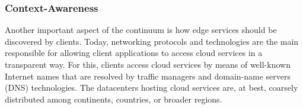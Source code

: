 






\subsubsection{Context-Awareness}



Another important aspect of the continuum is how edge services should be discovered by clients. Today, networking protocols and technologies are the main responsible for allowing client applications to access cloud services in a transparent way. For this, clients access cloud services by means of well-known Internet names that are resolved by traffic managers and domain-name servers (DNS) technologies. The datacenters hosting cloud services are, at best, coarsely distributed among continents, countries, or broader regions. 


